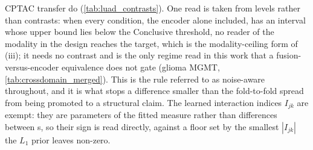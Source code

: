 CPTAC transfer do (\cref{tab:luad_contrasts}). One read is taken from
levels rather than contrasts: when every condition, the encoder alone
included, has an interval whose upper bound lies below the Conclusive
threshold, no reader of the modality in the design reaches the target,
which is the modality-ceiling form of (iii); it needs no contrast and
is the only regime read in this work that a fusion-versus-encoder
equivalence does not gate (glioma MGMT, \cref{tab:crossdomain_merged}).
This is the rule referred
to as noise-aware throughout, and it is what stops a difference smaller
than the fold-to-fold spread from being promoted to a structural claim.
The learned interaction indices $I_{jk}$ are exempt: they are parameters
of the fitted measure rather than differences between \auroc{}s, so their
sign is read directly, against a floor set by the smallest $|I_{jk}|$
the $L_1$ prior leaves non-zero.

